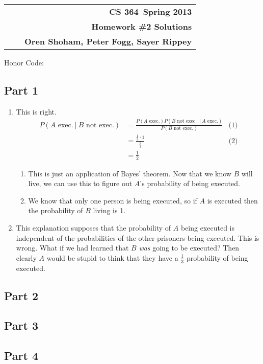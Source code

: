 \documentclass[11pt]{article}
\makeatletter
\newcommand{\course}{CS 364}
\newcommand{\semester}{Spring 2013}
\newcommand{\hwk}{Homework \#2 Solutions}
\newcommand{\student}{Oren Shoham, Peter Fogg, Sayer Rippey}
\renewcommand\maketitle{
  \begin{center}
    \begin{tabular*}{6.44in}{l @{\extracolsep{\fill}}c r}
      \bfseries  &  & \bfseries \course ~\semester \\
      \bfseries&  & \bfseries  \hwk  \\
      \bfseries   &   &  \bfseries \student \\ 
    \end{tabular*}
\end{center} }
\makeatother
\begin{document}
\maketitle
\thispagestyle{plain}


\noindent Honor Code: 

\subsection*{Part 1}
\begin{enumerate}
\item This is right.
  \begin{align*}
    P(A \text{ exec.}\ |\ B \text{ not exec.}) &= \frac{P(\text{$A$ exec.})P(\text{$B$ not exec. $\ |\ A$ exec.})}{P(\text{$B$ not exec.})} & \text{(1)} \\
    &= \frac{\frac{1}{3} \cdot 1}{\frac{2}{3}} & \text{(2)} \\
    &= \frac{1}{2}
  \end{align*}
  \begin{enumerate}[(1)]
    \item This is just an application of Bayes' theorem. Now that we know $B$ will live, we can use this to figure out $A$'s probability of being executed.
    \item We know that only one person is being executed, so if $A$ is executed then the probability of $B$ living is 1.
  \end{enumerate}
\item This explanation supposes that the probability of $A$ being executed is independent of the probabilities of the other prisoners being executed. This is wrong. What if we had learned that $B$ \emph{was} going to be executed? Then clearly $A$ would be stupid to think that they have a $\frac{1}{3}$ probability of being executed.
\end{enumerate}
\subsection*{Part 2}
\subsection*{Part 3}
\subsection*{Part 4}
\end{document}
